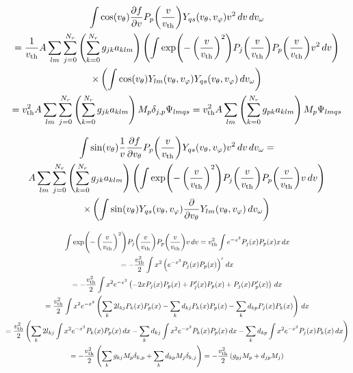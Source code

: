 \documentclass{article}[draft]
\begin{document}
\begin{multline*}
\myint \cos\of{\vtheta} \frac{\partial f}{\partial \vr} P_p\of{\frac{\vr}{\vth}} Y_{qs}\of{\vtheta,\vphi} \vr^2 \diff{\vr} \diff{\vomega}
\\
=
\frac{1}{\vth}
A \sum_{lm} \sum_{j=0}^{N_r} \left(\sum_{k=0}^{N_r} g_{jk} a_{klm} \right) 
\left(
\int 
\exp\of{-\left(\frac{\vr}{\vth}\right)^2} P_j\of{\frac{v}{\vth}} P_p\of{\frac{\vr}{\vth}} \vr^2 
\diff{v}
\right)
\\
\times
\left(
\int
\cos\of{\vtheta} 
Y_{lm}\of{\vtheta,\vphi}
Y_{qs}\of{\vtheta,\vphi}
\diff{\vomega}
\right)
\\
=
\vth^2
A \sum_{lm} \sum_{j=0}^{N_r} \left(\sum_{k=0}^{N_r} g_{jk} a_{klm} \right) 
M_{p} \delta_{j,p}
\Psi_{lmqs}
=
\vth^2
A \sum_{lm} \left(\sum_{k=0}^{N_r} g_{pk} a_{klm} \right) 
M_{p}
\Psi_{lmqs}
\end{multline*}

\begin{multline*}
\myint \sin\of{\vtheta} \frac{1}{\vr} \frac{\partial f}{\partial \vtheta} P_p\of{\frac{v}{\vth}} Y_{qs}\of{\vtheta,\vphi} \vr^2 \diff{\vr} \diff{\vomega}
=
\\
A \sum_{lm} \sum_{j=0}^{N_r} \left(\sum_{k=0}^{N_r} g_{jk} a_{klm} \right) 
\left(
\int 
\exp\of{-\left(\frac{\vr}{\vth}\right)^2} P_j\of{\frac{\vr}{\vth}} P_p\of{\frac{\vr}{\vth}} \vr
\diff{\vr}
\right)
\\
\times
\left(
\int
\sin\of{\vtheta} 
Y_{qs}\of{\vtheta,\vphi}
\frac{\partial}{\partial \vtheta}
Y_{lm}\of{\vtheta,\vphi}
\diff{\vomega}
\right)
\end{multline*}

\begin{multline*}
\int 
\exp\of{-\left(\frac{\vr}{\vth}\right)^2} P_j\of{\frac{\vr}{\vth}} P_p\of{\frac{\vr}{\vth}} \vr
\diff{\vr}
=
\vth^2
\int 
e^{-x^2} P_j\of{x} P_p\of{x} x
\diff{x}
\\
=
-
\frac{\vth^2}{2}
\int 
x^2
\left(
e^{-x^2} P_j\of{x} P_p\of{x}
\right)'
\diff{x}
\\
=
-
\frac{\vth^2}{2}
\int 
x^2
e^{-x^2} 
\left(
-2x
P_j\of{x} P_p\of{x}
+
P^\prime_j\of{x} P_p\of{x}
+
P_j\of{x} P^\prime_p\of{x}
\right)
\diff{x}
\\
=
\frac{\vth^2}{2}
\int 
x^2
e^{-x^2} 
\left(
\sum_{k} 2l_{kj} P_k\of{x} P_p\of{x}
-
\sum_{k} d_{kj} P_k\of{x} P_p\of{x}
-
\sum_{k} d_{kp} P_j\of{x} P_k\of{x}
\right)
\diff{x}
\\
=
\frac{\vth^2}{2}
\left(
\sum_{k} 2l_{kj} \int x^2 e^{-x^2} P_k\of{x} P_p\of{x} \diff{x}
-
\sum_{k} d_{kj} \int x^2 e^{-x^2} P_k\of{x} P_p\of{x} \diff{x}
-
\sum_{k} d_{kp} \int x^2 e^{-x^2} P_j\of{x} P_k\of{x} \diff{x}
\right)
\\
=
-
\frac{\vth^2}{2}
\left(
\sum_{k} g_{kj} M_p \delta_{k,p}
+
\sum_{k} d_{kp} M_j \delta_{k,j} 
\right)
=
-
\frac{\vth^2}{2}
\left(
g_{pj} M_p
+
d_{jp} M_j
\right)
\end{multline*}
\end{document}
